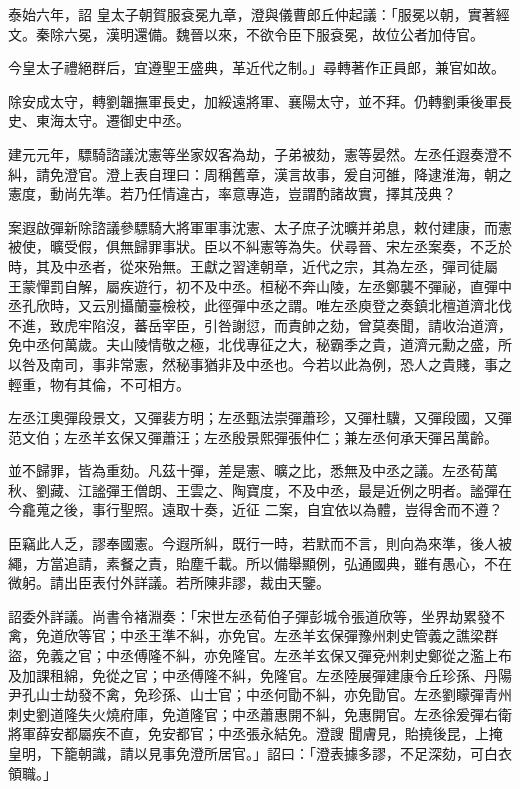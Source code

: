\begin{pinyinscope}
 泰始六年，詔
 皇太子朝賀服袞冕九章，澄與儀曹郎丘仲起議：「服冕以朝，實著經文。秦除六冕，漢明還備。魏晉以來，不欲令臣下服袞冕，故位公者加侍官。



 今皇太子禮絕群后，宜遵聖王盛典，革近代之制。」尋轉著作正員郎，兼官如故。



 除安成太守，轉劉韞撫軍長史，加綏遠將軍、襄陽太守，並不拜。仍轉劉秉後軍長史、東海太守。遷御史中丞。



 建元元年，驃騎諮議沈憲等坐家奴客為劫，子弟被劾，憲等晏然。左丞任遐奏澄不糾，請免澄官。澄上表自理曰：周稱舊章，漢言故事，爰自河雒，降逮淮海，朝之憲度，動尚先準。若乃任情違古，率意專造，豈謂酌諸故實，擇其茂典？



 案遐啟彈新除諮議參驃騎大將軍軍事沈憲、太子庶子沈曠并弟息，敕付建康，而憲被使，曠受假，俱無歸罪事狀。臣以不糾憲等為失。伏尋晉、宋左丞案奏，不乏於時，其及中丞者，從來殆無。王獻之習達朝章，近代之宗，其為左丞，彈司徒屬
 王蒙憚罰自解，屬疾遊行，初不及中丞。桓秘不奔山陵，左丞鄭襲不彈祕，直彈中丞孔欣時，又云別攝蘭臺檢校，此徑彈中丞之謂。唯左丞庾登之奏鎮北檀道濟北伐不進，致虎牢陷沒，蕃岳宰臣，引咎謝愆，而責帥之劾，曾莫奏聞，請收治道濟，免中丞何萬歲。夫山陵情敬之極，北伐專征之大，秘霸季之貴，道濟元勳之盛，所以咎及南司，事非常憲，然秘事猶非及中丞也。今若以此為例，恐人之貴賤，事之輕重，物有其倫，不可相方。



 左丞江奧彈段景文，又彈裴方明；左丞甄法崇彈蕭珍，又彈杜驥，又彈段國，又彈范文伯；左丞羊玄保又彈蕭汪；左丞殷景熙彈張仲仁；兼左丞何承天彈呂萬齡。



 並不歸罪，皆為重劾。凡茲十彈，差是憲、曠之比，悉無及中丞之議。左丞荀萬秋、劉藏、江謐彈王僧朗、王雲之、陶寶度，不及中丞，最是近例之明者。謐彈在今龕蒐之後，事行聖照。遠取十奏，近征
 二案，自宜依以為體，豈得舍而不遵？



 臣竊此人乏，謬奉國憲。今遐所糾，既行一時，若默而不言，則向為來準，後人被繩，方當追請，素餐之責，貽塵千載。所以備舉顯例，弘通國典，雖有愚心，不在微躬。請出臣表付外詳議。若所陳非謬，裁由天鑒。



 詔委外詳議。尚書令褚淵奏：「宋世左丞荀伯子彈彭城令張道欣等，坐界劫累發不禽，免道欣等官；中丞王準不糾，亦免官。左丞羊玄保彈豫州刺史管義之譙梁群盜，免義之官；中丞傅隆不糾，亦免隆官。左丞羊玄保又彈兗州刺史鄭從之濫上布及加課租綿，免從之官；中丞傅隆不糾，免隆官。左丞陸展彈建康令丘珍孫、丹陽尹孔山士劫發不禽，免珍孫、山士官；中丞何勖不糾，亦免勖官。左丞劉矇彈青州刺史劉道隆失火燒府庫，免道隆官；中丞蕭惠開不糾，免惠開官。左丞徐爰彈右衛將軍薛安都屬疾不直，免安都官；中丞張永結免。澄謏
 聞膚見，貽撓後昆，上掩皇明，下籠朝識，請以見事免澄所居官。」詔曰：「澄表據多謬，不足深劾，可白衣領職。」




\end{pinyinscope}
